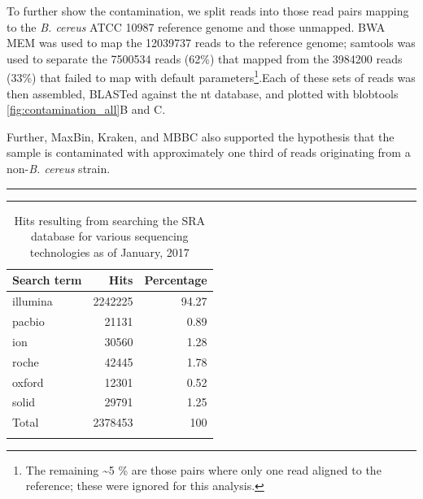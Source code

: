 \documentclass[10pt]{article}
\def \thoughtbr {\begin{center}\noindent\rule{.4\textwidth}{0.4pt}  {\raisebox{-.5ex}{$\sim$}}  \rule{.4\textwidth}{0.4pt}\end{center}}
\def \ttilde {\raisebox{-.5ex}\textasciitilde} %
\begin{document}
To further show the contamination, we split reads into those read pairs mapping to the \textit{B. cereus} ATCC 10987 reference genome and those unmapped.  BWA MEM\cite{Li2013} was used to map the 12039737 reads to the reference genome;  samtools was used to separate the 7500534 reads (62\%) that mapped from the 3984200 reads (33\%) that failed to map with default parameters\footnote{The remaining \ttilde5 \% are those pairs where only one read aligned to the reference; these were ignored for this analysis.}.Each of these sets of reads was then assembled, BLASTed against the nt database, and plotted with blobtools \ref{fig:contamination_all}B and C.


Further, MaxBin\cite{Wu2014}, Kraken, and MBBC\cite{Wang2011} also supported the hypothesis that the sample is contaminated with approximately one third of reads originating from a non-\textit{B. cereus} strain.

\thoughtbr
\newpage

\begin{table}[]
  \centering
  \caption{Hits resulting from searching the SRA database for various sequencing technologies as of January, 2017}
  \label{table:searchterms}
  \begin{tabular}{lrr}
    \toprule
    Search term & Hits & Percentage \\
    \midrule
    illumina & 2242225 & 94.27 \\
    pacbio & 21131 & 0.89 \\
    ion & 30560 & 1.28 \\
    roche & 42445 & 1.78 \\
    oxford & 12301 & 0.52 \\
    solid & 29791 & 1.25 \\
    \arrayrulecolor{lgray}\hline
    Total & 2378453 & 100\\
    \arrayrulecolor{black}
    \bottomrule
\end{tabular}
\end{table}
\end{document}
